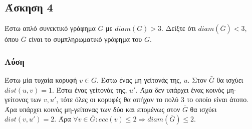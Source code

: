 \subsection*{Άσκηση 4}

Έστω απλό συνεκτικό γράφημα $G$ με $diam(G) > 3$. Δείξτε ότι $diam(\bar G) < 3$, όπου $\bar G$ είναι 
το συμπληρωματικό γράφημα του $G$.

\subsubsection*{Λύση}

Έστω μία τυχαία κορυφή $v \in G$. Έστω ένας μη γείτονάς της, $u$. Στον $\bar G$ θα ισχύει $dist(u,v) = 1$.
Έστω ένας γείτονάς της, $u'$. Άμα δεν υπάρχει ένας κοινός μη-γείτονας των $v,u'$, τότε όλες οι κορυφές θα απήχαν το πολύ 3 το οποίο είναι άτοπο.
Άρα υπάρχει κοινός μη-γείτονας των δύο και επομένως στον $\bar G$ θα ισχύει $dist(v,u') = 2$. Άρα $\forall v \in \bar G : ecc(v) \le 2 \Rightarrow diam(\bar G) \le 2$.

